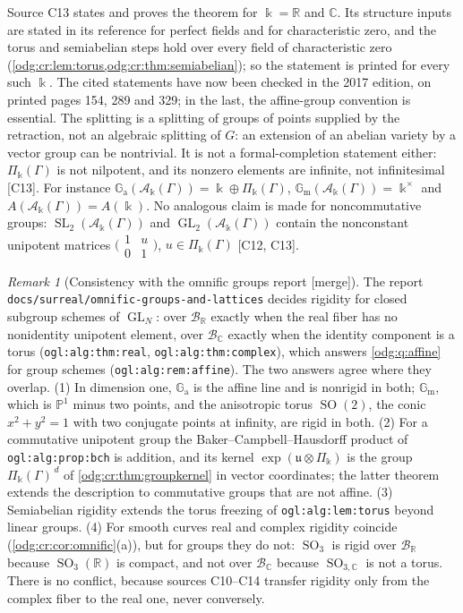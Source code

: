 \documentclass[11pt,oneside]{article}
\numberwithin{equation}{section}
\theoremstyle{definition}
\theoremstyle{remark}
\newtheorem{remark}[remark]{Remark}
\newcommand{\R}{\mathbb R}
\newcommand{\C}{\mathbb C}
\newcommand{\BR}{\mathcal B_{\R}}
\newcommand{\BC}{\mathcal B_{\C}}
\newcommand{\GL}{\operatorname{GL}}
\newcommand{\SL}{\operatorname{SL}}
\newcommand{\SO}{\operatorname{SO}}
\newcommand{\src}[1]{\textup{\textsf{\small[#1]}}}
\newcommand{\mergetag}{\textup{\textsf{\small[merge]}}}
\newcommand{\replabel}[1]{\nolinkurl{#1}}
\newcommand{\fn}[1]{\nolinkurl{#1}}
\newcommand{\crA}{\mathcal A_\Bbbk(\Gamma)}
\newcommand{\crP}{\Pi_\Bbbk(\Gamma)}
\newcommand{\Gm}{\mathbb G_{\mathrm m}}
\newcommand{\Ga}{\mathbb G_{\mathrm a}}
\begin{document}
Source C13 states and proves the theorem for $\Bbbk=\R$ and $\C$. Its structure inputs
are stated in its reference for perfect fields and for characteristic zero, and the
torus and semiabelian steps hold over every field of characteristic zero
(\cref{odg:cr:lem:torus,odg:cr:thm:semiabelian}); so the statement is printed for every
such $\Bbbk$. The cited statements have now been checked in the 2017 edition,
on printed pages 154, 289 and 329; in the last, the affine-group convention
is essential. The splitting is a splitting of groups of points
supplied by the retraction, not an algebraic splitting of $G$: an extension of an
abelian variety by a vector group can be nontrivial. It is not a formal-completion
statement either: $\crP$ is not nilpotent, and its nonzero elements are infinite, not
infinitesimal \src{C13}. For instance $\Ga(\crA)=\Bbbk\oplus\crP$, $\Gm(\crA)=\Bbbk^\times$
and $A(\crA)=A(\Bbbk)$. No analogous claim is made for noncommutative groups:
$\SL_2(\crA)$ and $\GL_2(\crA)$ contain the nonconstant unipotent matrices
$\bigl(\begin{smallmatrix}1&u\\0&1\end{smallmatrix}\bigr)$, $u\in\crP$
\src{C12, C13}.

\begin{remark}[Consistency with the omnific groups report \mergetag]\label{odg:cr:rem:ogl}
The report \fn{docs/surreal/omnific-groups-and-lattices} decides rigidity for closed
subgroup schemes of $\GL_N$: over $\BR$ exactly when the real fiber has no
nonidentity unipotent element, over $\BC$ exactly when the identity component is a
torus (\replabel{ogl:alg:thm:real}, \replabel{ogl:alg:thm:complex}), which answers
\cref{odg:q:affine} for group schemes (\replabel{ogl:alg:rem:affine}). The two
answers agree where they overlap. (1) In dimension one, $\Ga$ is the affine line and
is nonrigid in both; $\Gm$, which is $\mathbb P^1$ minus two points, and the
anisotropic torus $\SO(2)$, the conic $x^2+y^2=1$ with two conjugate points at
infinity, are rigid in both. (2) For a commutative unipotent group the
Baker--Campbell--Hausdorff product of \replabel{ogl:alg:prop:bch} is addition, and
its kernel $\exp(\mathfrak u\otimes\Pi_\Bbbk)$ is the group $\crP^{\,d}$ of
\cref{odg:cr:thm:groupkernel} in vector coordinates; the latter theorem extends the
description to commutative groups that are not affine. (3) Semiabelian rigidity
extends the torus freezing of \replabel{ogl:alg:lem:torus} beyond linear groups. (4)
For smooth curves real and complex rigidity coincide
(\cref{odg:cr:cor:omnific}(a)), but for groups they do not: $\SO_3$ is rigid over
$\BR$ because $\SO_3(\R)$ is compact, and not over $\BC$ because $\SO_{3,\C}$ is not a
torus. There is no conflict, because sources C10--C14 transfer rigidity only from
the complex fiber to the real one, never conversely.
\end{remark}
\end{document}
